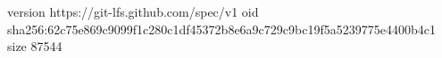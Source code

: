 version https://git-lfs.github.com/spec/v1
oid sha256:62c75e869c9099f1c280c1df45372b8e6a9c729c9bc19f5a5239775e4400b4c1
size 87544
